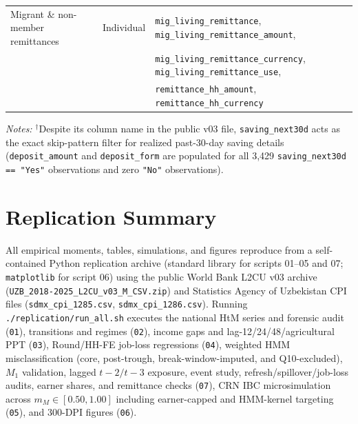 \documentclass[11pt]{article}
\begin{document}
\begin{table}[htbp]
\begin{tabular}{lll}
Migrant \& non-member remittances & Individual & \texttt{mig\_living\_remittance}, \texttt{mig\_living\_remittance\_amount}, \\
 & & \texttt{mig\_living\_remittance\_currency}, \texttt{mig\_living\_remittance\_use}, \\
 & & \texttt{remittance\_hh\_amount}, \texttt{remittance\_hh\_currency} \\
\bottomrule
\end{tabular}
\begin{flushleft}
\footnotesize\textit{Notes:} $^\dagger$Despite its column name in the public v03 file, \texttt{saving\_next30d} acts as the exact skip-pattern filter for realized past-30-day saving details (\texttt{deposit\_amount} and \texttt{deposit\_form} are populated for all 3,429 \texttt{saving\_next30d == "Yes"} observations and zero \texttt{"No"} observations).
\end{flushleft}
\end{table}

\section{Replication Summary}\label{app:rep}
\begingroup\sloppy\small
All empirical moments, tables, simulations, and figures reproduce from a self-contained Python replication archive (standard library for scripts 01--05 and 07; \texttt{matplotlib} for script 06) using the public World Bank L2CU v03 archive (\texttt{UZB\_2018-2025\_L2CU\_v03\_M\_CSV.zip}) and Statistics Agency of Uzbekistan CPI files (\texttt{sdmx\_cpi\_1285.csv}, \texttt{sdmx\_cpi\_1286.csv}). Running \texttt{./replication/run\_all.sh} executes the national HtM series and forensic audit (\texttt{01}), transitions and regimes (\texttt{02}), income gaps and lag-12/24/48/agricultural PPT (\texttt{03}), Round/HH-FE job-loss regressions (\texttt{04}), weighted HMM misclassification (core, post-trough, break-window-imputed, and Q10-excluded), $M_1$ validation, lagged $t-2/t-3$ exposure, event study, refresh/spillover/job-loss audits, earner shares, and remittance checks (\texttt{07}), CRN IBC microsimulation across $m_M \in [0.50, 1.00]$ including earner-capped and HMM-kernel targeting (\texttt{05}), and 300-DPI figures (\texttt{06}).
\endgroup

\clearpage


\end{document}
